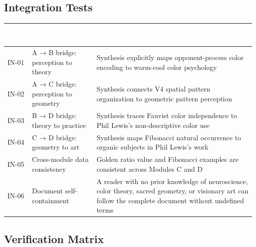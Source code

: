 \documentclass[11pt,letterpaper]{article}
\newcommand{\tableheader}[1]{\textbf{\sffamily\textcolor{white}{#1}}}
\begin{document}
\subsection{Integration Tests}

\begin{center}
\begin{tabularx}{\textwidth}{L{1.5cm}L{4cm}X}
\toprule
{}
\tableheader{Test ID} & \tableheader{Verifies} & \tableheader{Expected Behavior} \\
\midrule
IN-01 & A → B bridge: perception to theory & Synthesis explicitly maps opponent-process color encoding to warm-cool color psychology \\
IN-02 & A → C bridge: perception to geometry & Synthesis connects V4 spatial pattern organization to geometric pattern perception \\
IN-03 & B → D bridge: theory to practice & Synthesis traces Fauvist color independence to Phil Lewis's non-descriptive color use \\
IN-04 & C → D bridge: geometry to art & Synthesis maps Fibonacci natural occurrence to organic subjects in Phil Lewis's work \\
IN-05 & Cross-module data consistency & Golden ratio value and Fibonacci examples are consistent across Modules C and D \\
IN-06 & Document self-containment & A reader with no prior knowledge of neuroscience, color theory, sacred geometry, or visionary art can follow the complete document without undefined terms \\
\bottomrule
\end{tabularx}
\end{center}

\subsection{Verification Matrix}
\end{document}
